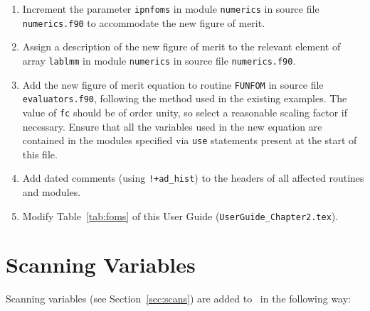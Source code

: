 \begin{enumerate}

\item Increment the parameter \texttt{ipnfoms} in module \texttt{numerics} in
  source file \texttt{numerics.f90} to accommodate the new figure of merit.

\item Assign a description of the new figure of merit to the relevant element
  of array \texttt{lablmm} in module \texttt{numerics} in source file
  \texttt{numerics.f90}.

\item Add the new figure of merit equation to routine \texttt{FUNFOM} in
  source file \texttt{evaluators.f90}, following the method used in the
  existing examples. The value of \texttt{fc} should be of order unity, so
  select a reasonable scaling factor if necessary. Ensure that all the
  variables used in the new equation are contained in the modules specified
  via \texttt{use} statements present at the start of this file.

\item Add dated comments (using \verb.!+ad_hist.) to the headers of
  all affected routines and modules.

\item Modify Table~\ref{tab:foms} of this User Guide
  (\texttt{UserGuide\_Chapter2.tex}).


\end{enumerate}

\section{Scanning Variables}

Scanning variables (see Section~\ref{sec:scans}) are added to \process\ in
the following way:

